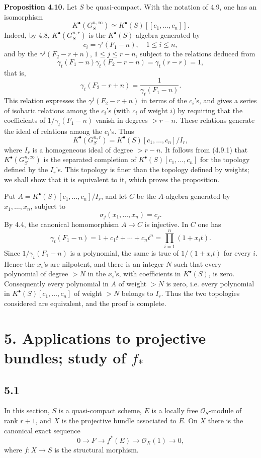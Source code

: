 \documentclass[11pt]{article}
\begin{document}
\textbf{Proposition 4.10.} Let \(S\) be quasi-compact. With the notation of 4.9, one has an isomorphism
\[
  K^\bullet(G_S^{n,\infty})\simeq K^\bullet(S)[[c_1,\ldots,c_n]].
\]
Indeed, by 4.8, \(K^\bullet(G_S^{n,r})\) is the \(K^\bullet(S)\)-algebra generated by
\[
  c_i=\gamma^i(F_1-n),\quad 1\leq i\leq n,
\]
and by the \(\gamma^j(F_2-r+n)\), \(1\leq j\leq r-n\), subject to the relations deduced from
\[
  \gamma_t(F_1-n)\gamma_t(F_2-r+n)=\gamma_t(r-r)=1,
\]
that is,
\[
  \gamma_t(F_2-r+n)=\frac{1}{\gamma_t(F_1-n)}.
\]
This relation expresses the \(\gamma^j(F_2-r+n)\) in terms of the \(c_i\)'s, and gives a series of isobaric relations among the \(c_i\)'s (with \(c_i\) of weight \(i\)) by requiring that the coefficients of \(1/\gamma_t(F_1-n)\) vanish in degrees \(>r-n\). These relations generate the ideal of relations among the \(c_i\)'s. Thus
\[
  K^\bullet(G_S^{n,r})=K^\bullet(S)[c_1,\ldots,c_n]/I_r,
\]
where \(I_r\) is a homogeneous ideal of degree \(>r-n\). It follows from (4.9.1) that \(K^\bullet(G_S^{n,\infty})\) is the separated completion of \(K^\bullet(S)[c_1,\ldots,c_n]\) for the topology defined by the \(I_r\)'s. This topology is finer than the topology defined by weights; we shall show that it is equivalent to it, which proves the proposition.

Put \(A=K^\bullet(S)[c_1,\ldots,c_n]/I_r\), and let \(C\) be the \(A\)-algebra generated by \(x_1,\ldots,x_n\), subject to
\[
  \sigma_j(x_1,\ldots,x_n)=c_j.
\]
By 4.4, the canonical homomorphism \(A\to C\) is injective. In \(C\) one has
\[
  \gamma_t(F_1-n)=1+c_1t+\cdots+c_nt^n
    =\prod_{i=1}^{n}(1+x_i t).
\]
Since \(1/\gamma_t(F_1-n)\) is a polynomial, the same is true of \(1/(1+x_i t)\) for every \(i\). Hence the \(x_i\)'s are nilpotent, and there is an integer \(N\) such that every polynomial of degree \(>N\) in the \(x_i\)'s, with coefficients in \(K^\bullet(S)\), is zero. Consequently every polynomial in \(A\) of weight \(>N\) is zero, i.e. every polynomial in \(K^\bullet(S)[c_1,\ldots,c_n]\) of weight \(>N\) belongs to \(I_r\). Thus the two topologies considered are equivalent, and the proof is complete.

\section*{5. Applications to projective bundles; study of \(f_*\)}

\subsection*{5.1}
In this section, \(S\) is a quasi-compact scheme, \(E\) is a locally free \(\mathcal O_S\)-module of rank \(r+1\), and \(X\) is the projective bundle associated to \(E\). On \(X\) there is the canonical exact sequence
\[
  0\longrightarrow F\longrightarrow f^*(E)\longrightarrow \mathcal O_X(1)\longrightarrow 0,
\]
where \(f:X\to S\) is the structural morphism.
\end{document}
